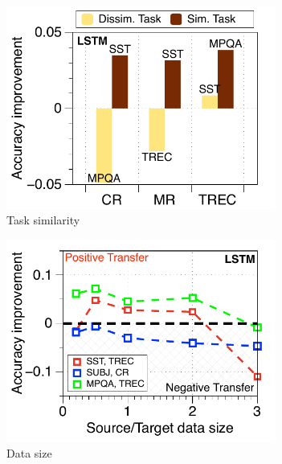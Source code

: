 \begin{figure}[!t]
	\centering
	\begin{subfigure}[b]{0.33\textwidth}
		\centering
		\includegraphics[width=0.975\textwidth]{figures/task_sim_norm_lstm.pdf}
		\caption{Task similarity}
		\label{fig_ab_sim}
	\end{subfigure}%
	\begin{subfigure}[b]{0.33\textwidth}
		\centering
		\includegraphics[width=0.975\textwidth]{figures/ratio_norm_3_pairs_lstm.pdf}
		\caption{Data size}
		\label{fig_ab_data}
	\end{subfigure}
	\begin{subfigure}[b]{0.33\textwidth}
		\centering

\end{subfigure}
\end{figure}
